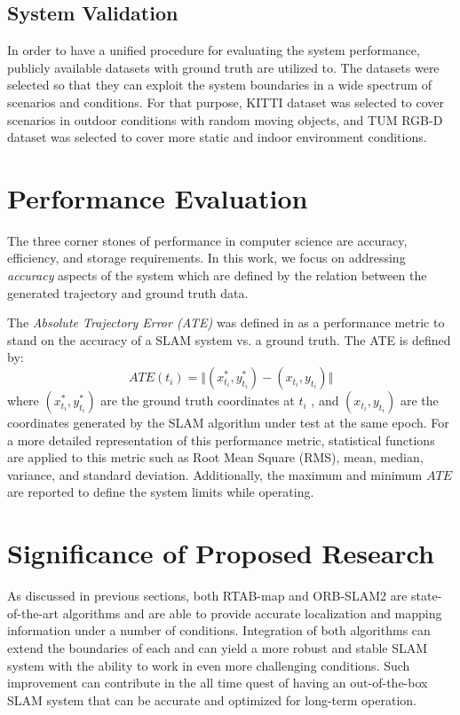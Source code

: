 \documentclass[12pt]{article}
\begin{document}
\subsection{System Validation}
In order to have a unified procedure for evaluating the system performance, publicly available datasets with ground truth are utilized to. The datasets were selected so that they can exploit the system boundaries in a wide spectrum of scenarios and conditions. For that purpose, KITTI dataset \cite{Geiger2012CVPR} was selected to cover scenarios in outdoor conditions with random moving objects, and TUM RGB-D dataset \cite{sturm2012benchmark} was selected to cover more static and indoor environment conditions.

\section{Performance Evaluation}
The three corner stones of performance in computer science are accuracy, efficiency, and storage requirements. In this work, we focus on addressing \textit{accuracy} aspects of the system which are defined by the relation between the generated trajectory and ground truth data. 

The \textit{Absolute Trajectory Error (ATE)} was defined in \cite{8710464} as a performance metric to stand on the accuracy of a SLAM system vs. a ground truth. The ATE is defined by:
\begin{equation}
ATE(t_i) = \Vert (x_{t_i}^*,y_{t_i}^*) - (x_{t_i},y_{t_i}) \Vert
\end{equation}
where $(x_{t_i}^*,y_{t_i}^*)$ are the ground truth coordinates at $t_i$ , and $(x_{t_i},y_{t_i})$ are the coordinates generated by the SLAM algorithm under test at the same epoch. For a more detailed representation of this performance metric, statistical functions are applied to this metric such as Root Mean Square (RMS), mean, median, variance, and standard deviation. Additionally, the maximum and minimum $ATE$ are reported to define the system limits while operating. 
\section{Significance of Proposed Research}
As discussed in previous sections, both RTAB-map and ORB-SLAM2 are state-of-the-art algorithms and are able to provide accurate localization and mapping information under a number of conditions. Integration of both algorithms can extend the boundaries of each and can yield a more robust and stable SLAM system with the ability to work in even more challenging conditions. Such improvement can contribute in the all time quest of having an out-of-the-box SLAM system \cite{cadena2016past} that can be accurate and optimized for long-term operation.

\newpage


 
\end{document}
